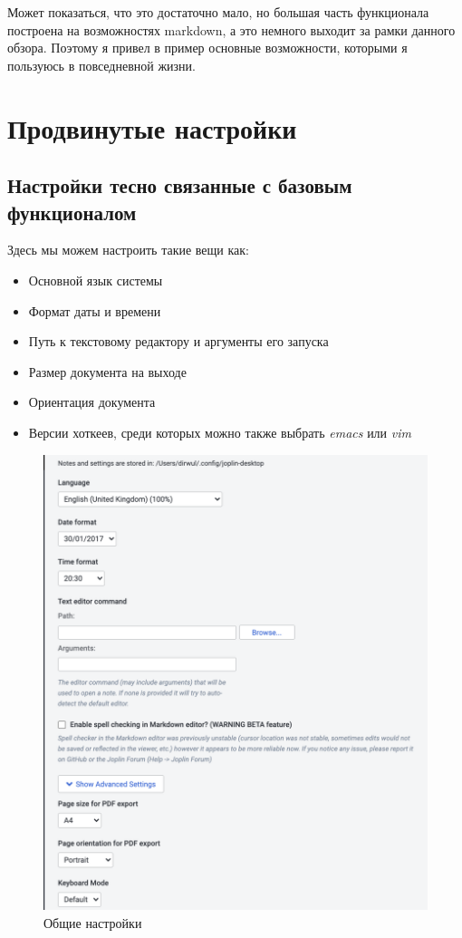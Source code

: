 \documentclass[12pt, a4paper]{article}
\begin{document}
    Может показаться, что это достаточно мало, но большая часть 
    функционала построена на возможностях markdown, а это немного выходит за рамки
    данного обзора.
    Поэтому я привел в пример основные возможности, которыми я пользуюсь в повседневной жизни.

    \newpage
    \section{Продвинутые настройки}
    \subsection{Настройки тесно связанные с базовым функционалом}
    Здесь мы можем настроить такие вещи как:
    \begin{itemize}
        \item Основной язык системы
        \item Формат даты и времени
        \item Путь к текстовому редактору и аргументы его запуска
        \item Размер документа на выходе
        \item Ориентация документа
        \item Версии хоткеев, среди которых можно также выбрать \textit{emacs} или \textit{vim}
    \end{itemize}
    \begin{figure}[H]
        \centering
        \includegraphics[width=0.75\linewidth]{src/13.png}
        \caption{Общие настройки}
    \end{figure}
\end{document}
